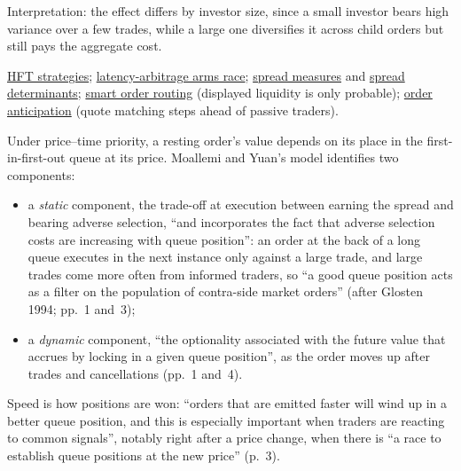 \begin{qfresult}
Interpretation: the effect differs by investor size, since a small investor bears high variance over a few trades, while a large one diversifies it across child orders but still pays the aggregate cost.

 \hyperref[def:hft-strategies]{HFT strategies}; \hyperref[res:latency-arbitrage-arms-race]{latency-arbitrage arms race}; \hyperref[def:spread-measures]{spread measures} and \hyperref[res:spread-determinants]{spread determinants}; \hyperref[def:smart-order-routing]{smart order routing} (displayed liquidity is only probable); \hyperref[def:order-anticipation]{order anticipation} (quote matching steps ahead of passive traders).

\end{qfresult}

\begin{qfresult}\label{res:queue-position-value}
 Under price--time priority, a resting order's value depends on its place in the first-in-first-out queue at its price. Moallemi and Yuan's model \citep[author working paper, June 2017 revision, abstract and sec.~1, pp.~1--4]{wide-moallemi-yuan-queue} identifies two components:
\begin{itemize}\setlength{\itemsep}{0pt}
\item a \emph{static} component, the trade-off at execution between earning the spread and bearing adverse selection, ``and incorporates the fact that adverse selection costs are increasing with queue position'': an order at the back of a long queue executes in the next instance only against a large trade, and large trades come more often from informed traders, so ``a good queue position acts as a filter on the population of contra-side market orders'' (after Glosten 1994; pp.~1 and~3);
\item a \emph{dynamic} component, ``the optionality associated with the future value that accrues by locking in a given queue position'', as the order moves up after trades and cancellations (pp.~1 and~4).
\end{itemize}
Speed is how positions are won: ``orders that are emitted faster will wind up in a better queue position, and this is especially important when traders are reacting to common signals'', notably right after a price change, when there is ``a race to establish queue positions at the new price'' (p.~3).


\end{qfresult}
